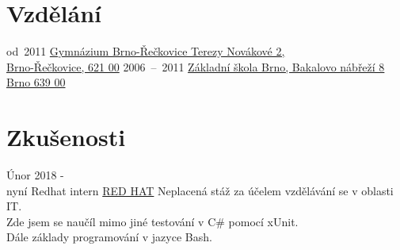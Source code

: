 \documentclass[letterpaper]{twentysecondcv} %
\begin{document}
\makeprofile %

\section{Vzdělání}

\begin{twenty} %
	\twentyitem
    	{od~2011}
        {}
        {}
        {\href{https://www.gyrec.cz/}{Gymnázium Brno-Řečkovice Terezy Novákové 2,\\ Brno-Řečkovice, 621 00}}
        {}
	\twentyitem
    	{2006~--~2011}
        {}
        {}
        {\href{https://www.bakalka.cz/}{Základní škola Brno, Bakalovo nábřeží 8 Brno 639 00}}
        {}
\end{twenty}




\section{Zkušenosti}

\begin{twenty} %
	\twentyitem
    	{Únor 2018 -\\ nyní}
        {Redhat intern}
        {\href{https://www.redhat.com/en/global/czech-republic}{RED HAT}}
        {}
        {
        {
       Neplacená stáž za účelem vzdělávání se v oblasti IT. \\
       Zde jsem se naučíl mimo jiné testování v C\# pomocí xUnit.\\
       Dále základy programování v jazyce Bash.
        }
    	}
        
\end{twenty}
\end{document}
